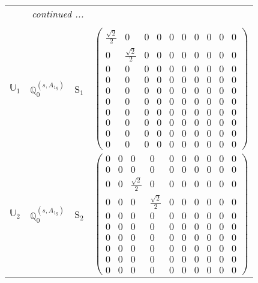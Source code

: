 \documentclass[fleqn,10pt,landscape]{article}
\begin{document}
\begin{itemize}
\begin{center}
\begin{longtable}{c|c|c|c}
 \hline \hline
\multicolumn{3}{r}{\footnotesize\it continued ...} \\ \endfoot

 \hline \hline
\multicolumn{3}{r}{} \\ \endlastfoot

$ \mathbb{U}_{1} $ & $\mathbb{Q}_{0}^{(s,A_{1g})}$ & S$_{1}$ & $\begin{pmatrix} \frac{\sqrt{2}}{2} & 0 & 0 & 0 & 0 & 0 & 0 & 0 & 0 & 0 \\ 0 & \frac{\sqrt{2}}{2} & 0 & 0 & 0 & 0 & 0 & 0 & 0 & 0 \\ 0 & 0 & 0 & 0 & 0 & 0 & 0 & 0 & 0 & 0 \\ 0 & 0 & 0 & 0 & 0 & 0 & 0 & 0 & 0 & 0 \\ 0 & 0 & 0 & 0 & 0 & 0 & 0 & 0 & 0 & 0 \\ 0 & 0 & 0 & 0 & 0 & 0 & 0 & 0 & 0 & 0 \\ 0 & 0 & 0 & 0 & 0 & 0 & 0 & 0 & 0 & 0 \\ 0 & 0 & 0 & 0 & 0 & 0 & 0 & 0 & 0 & 0 \\ 0 & 0 & 0 & 0 & 0 & 0 & 0 & 0 & 0 & 0 \\ 0 & 0 & 0 & 0 & 0 & 0 & 0 & 0 & 0 & 0 \end{pmatrix}$ \\ \hline
$ \mathbb{U}_{2} $ & $\mathbb{Q}_{0}^{(s,A_{1g})}$ & S$_{2}$ & $\begin{pmatrix} 0 & 0 & 0 & 0 & 0 & 0 & 0 & 0 & 0 & 0 \\ 0 & 0 & 0 & 0 & 0 & 0 & 0 & 0 & 0 & 0 \\ 0 & 0 & \frac{\sqrt{2}}{2} & 0 & 0 & 0 & 0 & 0 & 0 & 0 \\ 0 & 0 & 0 & \frac{\sqrt{2}}{2} & 0 & 0 & 0 & 0 & 0 & 0 \\ 0 & 0 & 0 & 0 & 0 & 0 & 0 & 0 & 0 & 0 \\ 0 & 0 & 0 & 0 & 0 & 0 & 0 & 0 & 0 & 0 \\ 0 & 0 & 0 & 0 & 0 & 0 & 0 & 0 & 0 & 0 \\ 0 & 0 & 0 & 0 & 0 & 0 & 0 & 0 & 0 & 0 \\ 0 & 0 & 0 & 0 & 0 & 0 & 0 & 0 & 0 & 0 \\ 0 & 0 & 0 & 0 & 0 & 0 & 0 & 0 & 0 & 0 \end{pmatrix}$ \\ \hline

\end{longtable}
\end{center}
\end{itemize}
\end{document}
